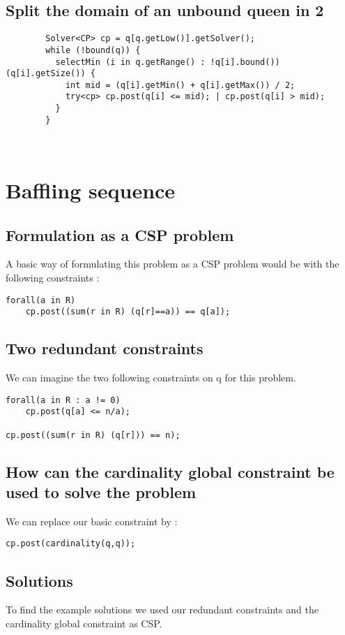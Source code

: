 \documentclass{eplDoc}
\begin{document}
\subsection{Split the domain of an unbound queen in 2}      
\begin{lstlisting}
        Solver<CP> cp = q[q.getLow()].getSolver();
        while (!bound(q)) {
          selectMin (i in q.getRange() : !q[i].bound()) (q[i].getSize()) {
            int mid = (q[i].getMin() + q[i].getMax()) / 2;
            try<cp> cp.post(q[i] <= mid); | cp.post(q[i] > mid);
          }
        }
        
      
\end{lstlisting}

\section{Baffling sequence}


\subsection{Formulation as a CSP problem}
A basic way of formulating this problem as a CSP problem would be with the following constraints : 
\begin{lstlisting}
forall(a in R) 
    cp.post((sum(r in R) (q[r]==a)) == q[a]);
\end{lstlisting}

\subsection{Two redundant constraints}
We can imagine the two following constraints on q for this problem. 
\begin{lstlisting}
forall(a in R : a != 0) 
    cp.post(q[a] <= n/a);
  
cp.post((sum(r in R) (q[r])) == n);
\end{lstlisting}

\subsection{How can the cardinality global constraint be used to solve the problem}
We can replace our basic constraint by : 
\begin{lstlisting}
cp.post(cardinality(q,q));
\end{lstlisting}


\subsection{Solutions}
To find the example solutions we used our redundant constraints and the cardinality global constraint as CSP. 
\end{document}
